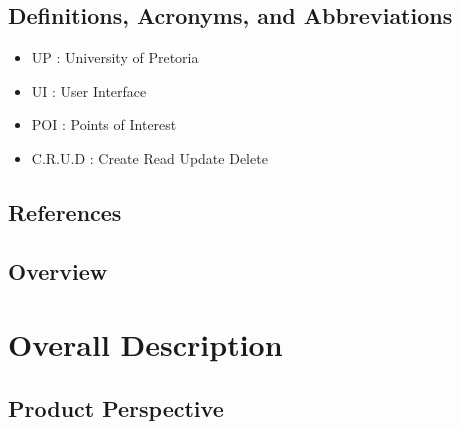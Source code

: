 \documentclass{article}
\begin{document}
        \subsection{Definitions, Acronyms, and Abbreviations}
	\begin{itemize}
  				\item UP : University of Pretoria
				\item UI : User Interface
				\item POI : Points of Interest
				\item C.R.U.D : Create Read Update Delete
			\end{itemize}
        \subsection{References}
        \subsection{Overview}
	
	\section{Overall Description}
		
        \subsection{Product Perspective}
        
\end{document}

